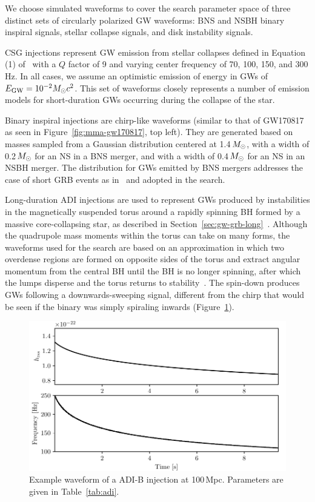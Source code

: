 We choose simulated waveforms to cover the search parameter space of three distinct sets of circularly polarized \ac{GW} waveforms: \ac{BNS} and \ac{NSBH} binary inspiral signals, stellar collapse signals, and disk instability signals.

\Ac{CSG} injections represent GW emission from stellar collapses defined in Equation (1) of~\citet{grb_o1} with a $Q$ factor of 9 and varying center frequency of 70, 100, 150, and 300\,Hz.
In all cases, we assume an optimistic emission of energy in \acp{GW} of $E_{\text{GW}} = 10^{-2} M_{\odot} c^2$.
This set of waveforms closely represents a number of emission models for short-duration \acp{GW} occurring during the collapse of the star.

Binary inspiral injections are chirp-like waveforms (similar to that of GW170817 as seen in Figure~\ref{fig:mma-gw170817}, top left).
They are generated based on masses sampled from a Gaussian distribution centered at 1.4\,$M_{\odot}$, with a width of 0.2\,$M_{\odot}$ for an \ac{NS} in a \ac{BNS} merger, and with a width of 0.4\,$M_{\odot}$ for an \ac{NS} in an \ac{NSBH} merger.
The distribution for \acp{GW} emitted by \ac{BNS} mergers addresses the case of short \ac{GRB} events as in~\citet{grb_o1} and adopted in the \pygrb search.

Long-duration \ac{ADI} injections are used to represent \acp{GW} produced by instabilities in the magnetically suspended torus around a rapidly spinning \ac{BH} formed by a massive core-collapsing star, as described in Section~\ref{sec:gw-grb-long}~\citep{vanPutten_2001, vanPutten_2004}.
Although the quadrupole mass moments within the torus can take on many forms, the waveforms used for the \xpip search are based on an approximation in which two overdense regions are formed on opposite sides of the torus and extract angular momentum from the central BH until the BH is no longer spinning, after which the lumps disperse and the torus returns to stability~\citep{Santamaria_2013}.
The spin-down produces GWs following a downwards-sweeping signal, different from the chirp that would be seen if the binary was simply spiraling inwards (Figure~\ref{fig:vanputten}).

\begin{figure}[h]
	\includegraphics{figures/grb/vanputten.pdf}
	\caption{Example waveform of a ADI-B injection at 100\,Mpc. Parameters are given in Table~\protect\ref{tab:adi}.}
	\label{fig:vanputten}
\end{figure}

